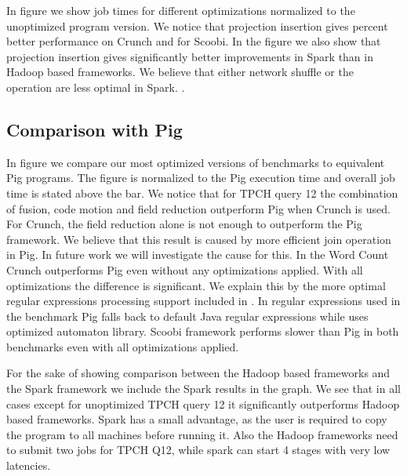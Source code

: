 In figure \todo{\ref{}} we show job times for different optimizations normalized to the unoptimized program version. We notice that projection insertion gives  percent better performance on Crunch and  for Scoobi. In the figure we also show that projection insertion gives significantly better improvements in Spark than in Hadoop based frameworks. We believe that either network shuffle or the  operation are less optimal in Spark. .


\subsection{Comparison with Pig}
\label{subsec:pig}
In figure \todo{\ref{}} we compare our most optimized versions of benchmarks to equivalent Pig programs. The figure is normalized to the Pig execution time and overall job time is stated above the bar. We notice that for TPCH query 12 the combination of fusion, code motion and field reduction outperform Pig when Crunch is used. For Crunch, the field reduction alone is not enough to outperform the Pig framework. We believe that this result is caused by more efficient join operation in Pig. In future work we will investigate the cause for this.
In the Word Count Crunch outperforms Pig even without any optimizations applied. With all optimizations the difference is significant. We explain this by the more optimal regular expressions processing support included in \tool. In regular expressions used in the benchmark Pig falls back to default Java regular expressions while \tool uses optimized automaton library. Scoobi framework performs slower than Pig in both benchmarks even with all optimizations applied.

For the sake of showing comparison between the Hadoop based frameworks and the Spark framework we include the Spark results in the graph. We see that in all cases except for unoptimized TPCH query 12 it significantly outperforms Hadoop based frameworks.  Spark has a small advantage, as the user is required to copy the program to all machines before running it. Also the Hadoop frameworks need to submit two jobs for TPCH Q12, while spark can start 4 stages with very low latencies.

